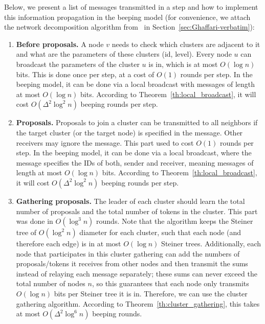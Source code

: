 
Below, we present a list of messages transmitted in %
a step and how to implement this information %
propagation in the beeping model (for convenience, we attach the network decomposition algorithm from~\cite{ghaffari2021improved} in Section~\ref{sec:Ghaffari-verbatim}):
\begin{enumerate}
    \item \textbf{Before proposals.} A node $v$ needs to check which clusters are adjacent to it and what are the parameters of these clusters (id, level). Every node $u$ can broadcast the parameters of the cluster $u$ is in, which is at most $O(\log n)$ bits. This is done once per step, %
    at a cost of $O(1)$ \congest rounds per step. In the beeping model, it can be done via a local broadcast with messages of length at most $O(\log n)$ bits. According to Theorem~\ref{th:local_broadcast}, it will cost $O(\Delta^2 \log^2 n)$ beeping rounds per step.
    \item \textbf{Proposals.} Proposals to join a cluster can be transmitted to all neighbors if the target cluster (or the target node) is specified in the message. Other receivers may ignore the message. This part used to cost $O(1)$ \congest rounds per step. 
    In the beeping model, it can be done via a local broadcast, where the message specifies the IDs of both, sender and receiver, meaning messages of length at most $O(\log n)$ bits. According to Theorem~\ref{th:local_broadcast}, it will cost $O(\Delta^2 \log^2 n)$ beeping rounds per step.
    \item \textbf{Gathering proposals.} The leader of each cluster should learn the total number of proposals and the total number of tokens in the cluster. This part was done in $O(\log^3 n)$ \congest rounds. %
    Note that the algorithm keeps the Steiner tree of $O(\log^2 n)$ diameter for each cluster, such that each node (and therefore each edge) is in at most $O(\log n)$ Steiner trees. Additionally, each node that participates in this cluster gathering  can add the numbers of proposals/tokens it receives from other nodes and then transmit the sums instead of relaying each message separately; these sums can never exceed the total number of nodes $n$, so this guarantees that each node only transmits $O(\log n)$ bits per Steiner tree it is in. Therefore, we can use the cluster gathering algorithm. According to Theorem~\ref{th:cluster_gathering}, this takes at most $O(\Delta^2 \log^6 n)$ beeping rounds.

\end{enumerate}
